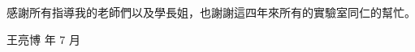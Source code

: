 \begin{acknowledgementszh}
感謝所有指導我的老師們以及學長姐，也謝謝這四年來所有的實驗室同仁的幫忙。

\hspace{1.5em}\hfill 王亮博 年 7 月
\end{acknowledgementszh}

